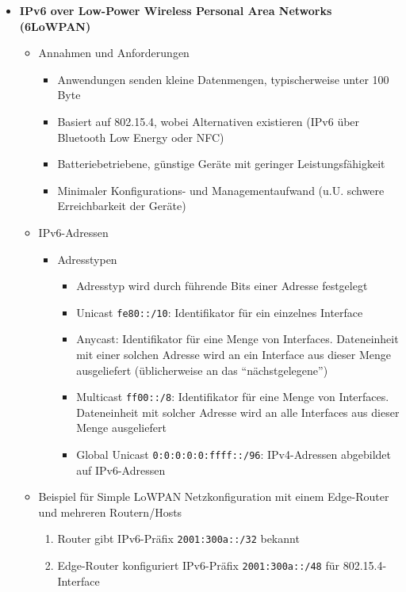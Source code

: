 \begin{itemize}
\begin{itemize}
\begin{itemize}
		\end{itemize}
	\end{itemize}
	\item \textbf{IPv6 over Low-Power Wireless Personal Area Networks (6LoWPAN)}
	\begin{itemize}
		\item Annahmen und Anforderungen
		\begin{itemize}
			\item Anwendungen senden kleine Datenmengen, typischerweise unter 100 Byte
			\item Basiert auf 802.15.4, wobei Alternativen existieren (IPv6 über Bluetooth Low Energy oder NFC)
			\item Batteriebetriebene, günstige Geräte mit geringer Leistungsfähigkeit
			\item Minimaler Konfigurations- und Managementaufwand (u.U. schwere Erreichbarkeit der Geräte)
		\end{itemize}
		\item IPv6-Adressen
		\begin{itemize}
			\item Adresstypen
			\begin{itemize}
				\item Adresstyp wird durch führende Bits einer Adresse festgelegt
				\item Unicast \texttt{fe80::/10}: Identifikator für ein einzelnes Interface
				\item Anycast: Identifikator für eine Menge von Interfaces. Dateneinheit mit einer solchen Adresse wird an ein Interface aus dieser Menge ausgeliefert (üblicherweise an das "`nächstgelegene"')
				\item Multicast \texttt{ff00::/8}: Identifikator für eine Menge von Interfaces. Dateneinheit mit solcher Adresse wird an alle Interfaces aus dieser Menge ausgeliefert
				\item Global Unicast \texttt{0:0:0:0:0:ffff::/96}: IPv4-Adressen abgebildet auf IPv6-Adressen
			\end{itemize}
		\end{itemize}
		\item Beispiel für Simple LoWPAN Netzkonfiguration mit einem Edge-Router und mehreren Routern/Hosts
		\begin{enumerate}
			\item Router gibt IPv6-Präfix \texttt{2001:300a::/32} bekannt
			\item Edge-Router konfiguriert IPv6-Präfix \texttt{2001:300a::/48} für 802.15.4-Interface

\end{enumerate}
\end{itemize}
\end{itemize}

